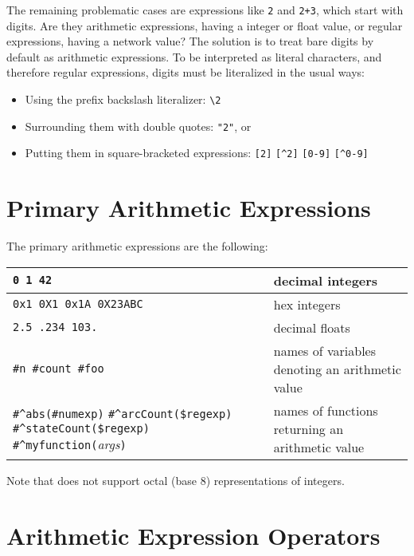 The remaining problematic cases are expressions like \verb!2! and
\verb!2+3!, which start with digits.  Are they arithmetic expressions,
having a integer or float value, or regular expressions, having a network
value?  The \Kleene{} solution is to treat bare digits by default as
arithmetic expressions.  To be interpreted as literal characters, and
therefore regular expressions, digits must be literalized in the usual
\Kleene{} ways:

\begin{itemize}
\item
Using the prefix backslash literalizer:  \verb!\2!
\item
Surrounding them with double quotes: \verb!"2"!, or
\item
Putting them in square-bracketed expressions: \verb![2]! \verb![^2]! \verb![0-9]! \verb![^0-9]!
\end{itemize}

\section{Primary Arithmetic Expressions}

The primary arithmetic expressions are the following:

\vspace{.5cm}

\renewcommand\tabcolsep{1.25mm}

\noindent
\begin{tabular}{|p{5.5cm}|l|}
\hline
\verb!0 1 42!  & decimal integers\\
\hline
\verb!0x1 0X1 0x1A 0X23ABC! & hex integers\\
\hline
\verb!2.5 .234 103.! & decimal floats\\
\hline
\verb!#n #count #foo! & names of variables denoting an arithmetic value\\
\hline
\verb!#^abs(#numexp)! \verb!#^arcCount($regexp)!
\verb!#^stateCount($regexp)! \verb!#^myfunction(!\emph{args}\verb!)! & names of functions returning an arithmetic value\\
\hline
\end{tabular}

\vspace{.5cm}

\noindent
Note that \Kleene{} does not support octal (base 8) representations of integers.

\section{Arithmetic Expression Operators}

